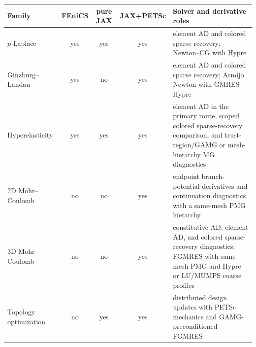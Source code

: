 \begin{tabular}{@{}l c c c >{\RaggedRight\arraybackslash}p{}@{}}
\toprule
Family & FEniCS & pure JAX & JAX+PETSc & Solver and derivative roles \\
\midrule
$p$-Laplace & yes & yes & yes & element AD and colored sparse recovery; Newton--CG with Hypre \\
Ginzburg--Landau & yes & no & yes & element AD and colored sparse recovery; Armijo Newton with GMRES--Hypre \\
Hyperelasticity & yes & yes & yes & element AD in the primary route, scoped colored sparse-recovery comparison, and trust-region/GAMG or mesh-hierarchy MG diagnostics \\
2D Mohr--Coulomb & no & no & yes & endpoint branch-potential derivatives and continuation diagnostics with a same-mesh PMG hierarchy \\
3D Mohr--Coulomb & no & no & yes & constitutive AD, element AD, and colored sparse-recovery diagnostics; FGMRES with same-mesh PMG and Hypre or LU/MUMPS coarse profiles \\
Topology optimization & no & yes & yes & distributed design updates with PETSc mechanics and GAMG-preconditioned FGMRES \\
\bottomrule
\end{tabular}
